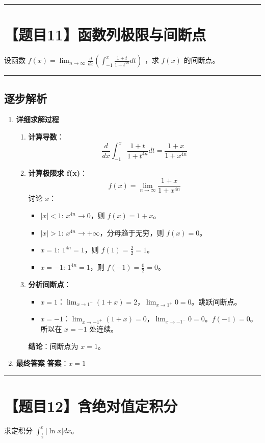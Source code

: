\documentclass[UTF8]{ctexart}
\newenvironment{redenv}{\color{red}}{}
\newenvironment{detailedanalysis}{%
    \color{red}
    \begin{enumerate}[label=\textbf{第\arabic*步：}, leftmargin=*, align=left, itemsep=1.5ex]
}{%
    \end{enumerate}
}
\newcommand{\problemrule}{\noindent\rule{\textwidth}{1.5pt}\vspace{-0.8em}}
\newcommand{\analysisrule}{\noindent\rule{\textwidth}{0.8pt}\vspace{-0.8em}}
\begin{document}
\problemrule
\section*{【题目11】函数列极限与间断点}
设函数 $ f(x)=\lim_{n\to\infty}\frac{d}{dx}\left(\int_{-1}^{x}\frac{1+t}{1+t^{4n}}dt\right) $ ，求 $ f(x) $ 的间断点。

\begin{redenv}
\analysisrule
\subsection*{逐步解析}

\begin{detailedanalysis}
\item \textbf{详细求解过程}
\begin{enumerate}[label=(\arabic*)]
\item \textbf{计算导数}：
$$ \frac{d}{dx} \int_{-1}^x \frac{1+t}{1+t^{4n}} dt = \frac{1+x}{1+x^{4n}} $$
\item \textbf{计算极限求 f(x)}：
$$ f(x) = \lim_{n \to \infty} \frac{1+x}{1+x^{4n}} $$
讨论 $x$：
\begin{itemize}
    \item $|x| < 1$: $x^{4n} \to 0$，则 $f(x) = 1+x$。
    \item $|x| > 1$: $x^{4n} \to +\infty$，分母趋于无穷，则 $f(x) = 0$。
    \item $x = 1$: $1^{4n} = 1$，则 $f(1) = \frac{2}{2} = 1$。
    \item $x = -1$: $1^{4n} = 1$，则 $f(-1) = \frac{0}{2} = 0$。
\end{itemize}
\item \textbf{分析间断点}：
\begin{itemize}
    \item $x=1$：$\lim_{x \to 1^-} (1+x) = 2$，$\lim_{x \to 1^+} 0 = 0$。跳跃间断点。
    \item $x=-1$：$\lim_{x \to -1^+} (1+x) = 0$，$\lim_{x \to -1^-} 0 = 0$。$f(-1)=0$。所以在 $x=-1$ 处连续。
\end{itemize}
\textbf{结论}：间断点为 $x=1$。
\end{enumerate}

\item \textbf{最终答案}
\textbf{答案}：$ x=1 $
\end{detailedanalysis}
\end{redenv}

\problemrule
\section*{【题目12】含绝对值定积分}
求定积分 $ \int_{\frac{1}{e}}^{e}|\ln x|dx $。
\end{document}
